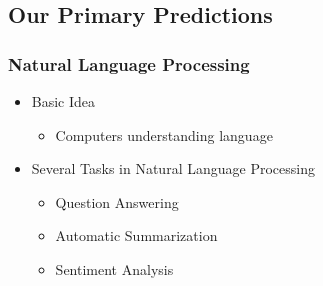 \documentclass[xcolor=dvipsnames]{beamer}
\begin{document}
\begin{frame}
\section{Our Primary Predictions}
\frametitle{Natural Language Processing}
	\begin{itemize}
		\item Basic Idea
		\begin{itemize}
			\item Computers understanding language
		\end{itemize}
		\item Several Tasks in Natural Language Processing
		\begin{itemize}
			\item Question Answering
			\item Automatic Summarization
			\item Sentiment Analysis
		\end{itemize}
	\end{itemize}
\end{frame}
\end{document}
